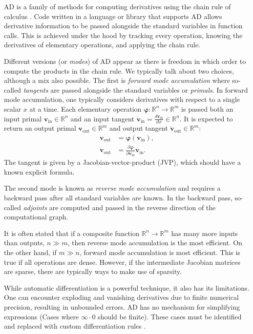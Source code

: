 \documentclass[preprint,12pt]{elsarticle}
\let\vec\bm
\numberwithin{equation}{section}
\begin{document}
AD is a family of methods for computing derivatives using the chain rule of calculus \cite{baydinAutomaticDifferentiationIn2018}.
Code written in a language or library that supports AD allows derivative information to be passed alongside the standard variables in function calls.
This is achieved under the hood by tracking every operation, knowing the derivatives of elementary operations, and applying the chain rule.

Different versions (or \emph{modes}) of AD appear as there is freedom in which order to compute the products in the chain rule.
We typically talk about two choices, although a mix also possible.
The first is \emph{forward mode accumulation} where so-called \emph{tangents} are passed alongside the standard variables or \textit{primals}. In forward mode accumulation, one typically considers derivatives with respect to a single scalar $x$ at a time.
Each elementary operation $\vec{\varphi}: \mathbb{R}^n \rightarrow \mathbb{R}^m$ is passed both an input primal $\vec{v}_{\text{in}} \in \mathbb{R}^n$ and an input tangent $\dot{\vec{v}}_{\text{in}} = \frac{d \vec{v}_{\text{in}}}{d x} \in \mathbb{R}^n$.
It is expected to return an output primal $\vec{v}_{\text{out}} \in \mathbb{R}^m$ and output tangent $\dot{\vec{v}}_\text{out} \in \mathbb{R}^m$:
\begin{align}
    \vec{v}_{\text{out}} &= \vec{\varphi}(\vec{v}_{\text{in}}), \\
    \dot{\vec{v}}_{\text{out}} &= \frac{\partial \vec{\varphi}}{\partial \vec{v}_{\text{in}}} \dot{\vec{v}}_{\text{in}}.
\end{align}
The tangent is given by a Jacobian-vector-product (JVP), which should have a known explicit formula.

The second mode is known as \emph{reverse mode accumulation} and requires a backward pass after all standard variables are known.
In the backward pass, so-called \emph{adjoints} are computed and passed in the reverse direction of the computational graph.

It is often stated that if a composite function $\mathbb{R}^n \to \mathbb{R}^m$ has many more inputs than outputs, $n \gg m$, then reverse mode accumulation is the most efficient. 
On the other hand, if $m \gg n$, forward mode accumulation is most efficient.
This is true if all operations are dense.
However, if the intermediate Jacobian matrices are sparse, there are typically ways to make use of sparsity.

While automatic differentiation is a powerful technique, it also has its limitations.
One can encounter exploding and vanishing derivatives due to finite numerical precision, resulting in unbounded errors.
AD has no mechanism for simplifying expressions (Cases where $\infty \cdot 0$ should be finite).
These cases must be identified and replaced with custom differentiation rules \cite{metzGradientsAreNot2022}.
\end{document}
